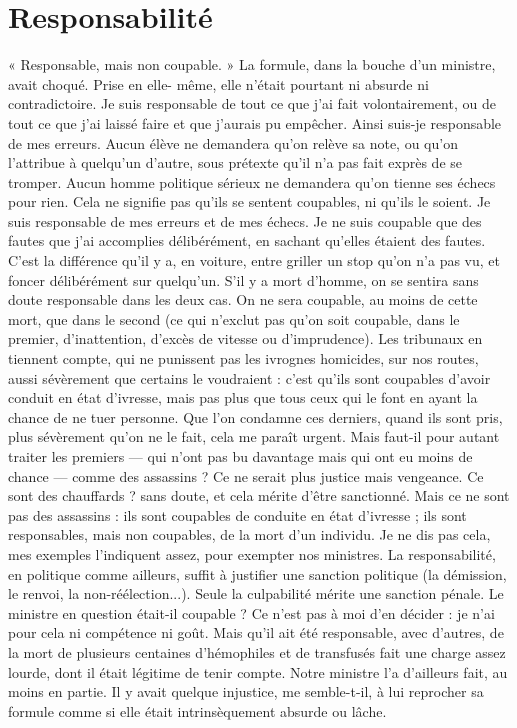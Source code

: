 \section{Responsabilité}
« Responsable, mais non coupable. » La formule, dans
la bouche d’un ministre, avait choqué. Prise en elle-
même, elle n’était pourtant ni absurde ni contradictoire. Je suis responsable de
tout ce que j'ai fait volontairement, ou de tout ce que j’ai laissé faire et que
j'aurais pu empêcher. Ainsi suis-je responsable de mes erreurs. Aucun élève ne
demandera qu’on relève sa note, ou qu’on l’attribue à quelqu'un d’autre, sous
prétexte qu’il n’a pas fait exprès de se tromper. Aucun homme politique sérieux
ne demandera qu’on tienne ses échecs pour rien. Cela ne signifie pas qu’ils se
sentent coupables, ni qu’ils le soient. Je suis responsable de mes erreurs et de
mes échecs. Je ne suis coupable que des fautes que j’ai accomplies délibérément,
en sachant qu’elles étaient des fautes. C’est la différence qu’il y a, en voiture,
entre griller un stop qu’on n’a pas vu, et foncer délibérément sur quelqu'un.
S’il y a mort d'homme, on se sentira sans doute responsable dans les deux cas.
On ne sera coupable, au moins de cette mort, que dans le second (ce qui
n'exclut pas qu’on soit coupable, dans le premier, d’inattention, d’excès de
vitesse ou d’imprudence). Les tribunaux en tiennent compte, qui ne punissent
pas les ivrognes homicides, sur nos routes, aussi sévèrement que certains le
voudraient : c’est qu’ils sont coupables d’avoir conduit en état d'ivresse, mais
pas plus que tous ceux qui le font en ayant la chance de ne tuer personne. Que
l’on condamne ces derniers, quand ils sont pris, plus sévèrement qu’on ne le
fait, cela me paraît urgent. Mais faut-il pour autant traiter les premiers — qui
n'ont pas bu davantage mais qui ont eu moins de chance — comme des
assassins ? Ce ne serait plus justice mais vengeance. Ce sont des chauffards ?
sans doute, et cela mérite d’être sanctionné. Mais ce ne sont pas des assassins :
ils sont coupables de conduite en état d’ivresse ; ils sont responsables, mais
non coupables, de la mort d’un individu. Je ne dis pas cela, mes exemples
l’indiquent assez, pour exempter nos ministres. La responsabilité, en politique
comme ailleurs, suffit à justifier une sanction politique (la démission, le
renvoi, la non-réélection...). Seule la culpabilité mérite une sanction pénale.
Le ministre en question était-il coupable ? Ce n’est pas à moi d’en décider : je
n'ai pour cela ni compétence ni goût. Mais qu’il ait été responsable, avec
d’autres, de la mort de plusieurs centaines d’hémophiles et de transfusés fait
une charge assez lourde, dont il était légitime de tenir compte. Notre ministre
l’a d’ailleurs fait, au moins en partie. Il y avait quelque injustice, me semble-t-il,
à lui reprocher sa formule comme si elle était intrinsèquement absurde ou
lâche.

